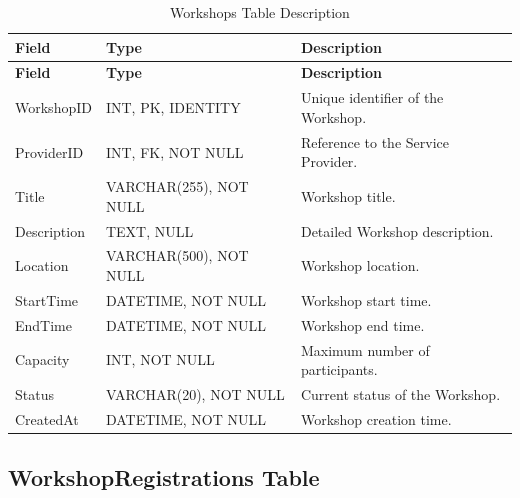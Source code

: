 \begin{longtable}{
		|>{\raggedright\arraybackslash}p{3.2cm}|
		>{\raggedright\arraybackslash}p{4.2cm}|
		>{\raggedright\arraybackslash}p{5.0cm}|
	}
	\caption{Workshops Table Description}
	\label{tab:workshops}\\
	\hline
	\textbf{Field} & \textbf{Type} & \textbf{Description} \\ \hline
	\endfirsthead
	\hline
	\textbf{Field} & \textbf{Type} & \textbf{Description} \\ \hline
	\endhead
	
	WorkshopID & INT, PK, IDENTITY &
	Unique identifier of the Workshop. \\ \hline
	
	ProviderID & INT, FK, NOT NULL &
	Reference to the Service Provider. \\ \hline
	
	Title & VARCHAR(255), NOT NULL &
	Workshop title. \\ \hline
	
	Description & TEXT, NULL &
	Detailed Workshop description. \\ \hline
	
	Location & VARCHAR(500), NOT NULL &
	Workshop location. \\ \hline
	
	StartTime & DATETIME, NOT NULL &
	Workshop start time. \\ \hline
	
	EndTime & DATETIME, NOT NULL &
	Workshop end time. \\ \hline
	
	Capacity & INT, NOT NULL &
	Maximum number of participants. \\ \hline
	
	Status & VARCHAR(20), NOT NULL &
	Current status of the Workshop. \\ \hline
	
	CreatedAt & DATETIME, NOT NULL &
	Workshop creation time. \\ \hline
	
\end{longtable}


\subsection{WorkshopRegistrations Table}

